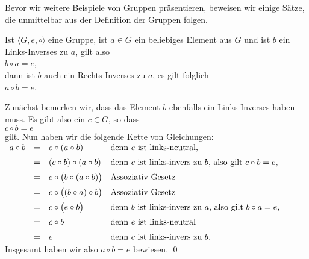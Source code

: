 Bevor wir weitere Beispiele von Gruppen präsentieren, beweisen wir einige Sätze, die unmittelbar aus der
Definition der Gruppen folgen.

\begin{Satz} \lb
  Ist $\langle G, e, \circ \rangle$ eine Gruppe, ist $a \in G$ ein beliebiges Element aus
  $G$ und ist $b$ ein Links-Inverses zu $a$, gilt also
  \\
  \hspace*{1.3cm}
  $b \circ a = e$,
  \\[0.2cm]
  dann ist $b$ auch ein Rechts-Inverses zu $a$, es gilt folglich
  \\[0.2cm]
  \hspace*{1.3cm}
  $a \circ b = e$.  
\end{Satz}

\proof
Zunächst bemerken wir, dass das Element $b$ ebenfalls ein Links-Inverses haben muss.  Es gibt also ein 
$c \in G$, so dass
\\[0.2cm]
\hspace*{1.3cm}
$c \circ b = e$
\\[0.2cm]
gilt.  Nun haben wir die folgende Kette von Gleichungen:
\\[0.2cm]
\hspace*{1.3cm}
$
\begin{array}[t]{lcll}
  a \circ b & = & e \circ (a \circ b)           & \mbox{denn $e$ ist links-neutral,} \\[0.2cm]
            & = & (c \circ b) \circ (a \circ b) 
                & \mbox{denn $c$ ist links-invers zu $b$, also gilt $c \circ b = e$,}  \\[0.2cm]
            & = & c \circ \bigl(b \circ (a \circ b)\bigr) 
                & \mbox{Assoziativ-Gesetz}  \\[0.2cm]
            & = & c \circ \bigl((b \circ a) \circ b\bigr) 
                & \mbox{Assoziativ-Gesetz}  \\[0.2cm]
            & = & c \circ \bigl(e \circ b\bigr) 
                & \mbox{denn $b$ ist links-invers zu $a$, also gilt $b \circ a = e$,}  \\[0.2cm]
            & = & c \circ b 
                & \mbox{denn $e$ ist links-neutral}  \\[0.2cm]
            & = & e 
                & \mbox{denn $c$ ist links-invers zu $b$.}  
\end{array}
$
\\[0.2cm]
Insgesamt haben wir also $a \circ b = e$ bewiesen. \qed

